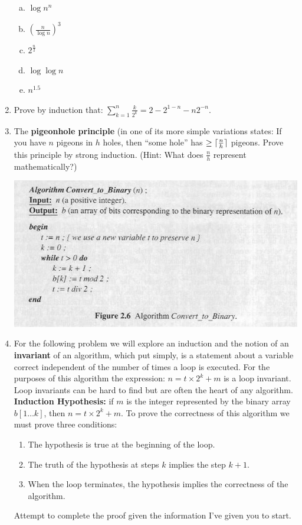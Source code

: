 \documentclass[12pt]{article}
\DeclarePairedDelimiter{\ceil}{\lceil}{\rceil}
\begin{document}
\begin{enumerate}
\begin{enumerate}[a)]
\item $\log{n^n}$\\
\item $(\frac{n}{\log{n}})^3$\\
\item  $2^{\frac{n}{2}}$\\
\item  $\log{\log{n}}$\\
\item  $n^{1.5}$\\
\end{enumerate}
\newpage
\item Prove by induction that: $\sum\limits_{k=1}^{n}{\frac{k}{2^k}}=2-2^{1-n}-n2^{-n}$.
\newpage
\item The \textbf{pigeonhole principle} (in one of its more simple variations states: 
If you have $n$ pigeons in $h$ holes, then ``some hole'' has $\ge \ceil{\frac{n}{h}}$ pigeons. 
Prove this principle by strong induction. (Hint: What does $\frac{n}{h}$ represent mathematically?)
\newpage
\centerline{\includegraphics[scale = 0.6]{algo.jpg}}
\item For the following problem we will explore an induction and the
notion of an \textbf{invariant} of an algorithm, which put simply, is a statement about
a variable correct independent of the number of times a loop is executed. For the purposes of 
this algorithm the expression: $n = t \times 2^k + m$ is a loop invariant. Loop invariants can 
be hard to find but are often the heart of any algorithm.\\
\textbf{Induction Hypothesis: } if $m$ is the integer represented by 
the binary array $b[1\dots k]$, then $n = t \times 2^k + m$. To prove the 
correctness of this algorithm we must prove three conditions:
\begin{enumerate}
\item The hypothesis is true at the beginning of the loop.
\item The truth of the hypothesis at steps $k$ implies the step $k+1$.
\item When the loop terminates, the hypothesis implies the correctness of the algorithm.
\end{enumerate}
Attempt to complete the proof given the information I've given you to start. 
\end{enumerate}
\end{document}
